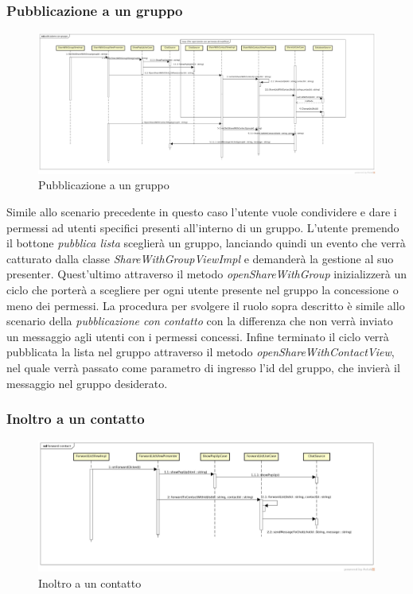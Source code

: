 \subsubsection{Pubblicazione a un gruppo}

\label{Pubblicazione a un gruppo}
\begin{figure}[H]
	\centering
	\includegraphics[width=\textwidth]{Sezioni/Diagrammi/App/publicazione_con_gruppo.jpg}
	\caption{Pubblicazione a un gruppo}
	
\end{figure}

Simile allo scenario precedente in questo caso l'utente vuole condividere e dare i permessi ad utenti specifici presenti all'interno di un gruppo. L'utente premendo il bottone \textit{pubblica lista} sceglierà un gruppo, lanciando quindi un evento che verrà catturato dalla classe \textit{ShareWithGroupViewImpl} e demanderà la gestione al suo presenter. Quest'ultimo attraverso il metodo \textit{openShareWithGroup} inizializzerà un ciclo che porterà a scegliere per ogni utente presente nel gruppo la concessione o meno dei permessi. La procedura per svolgere il ruolo sopra descritto è simile allo scenario della \textit{pubblicazione con contatto} con la differenza che non verrà inviato un messaggio agli utenti con i permessi concessi. Infine terminato il ciclo verrà pubblicata la lista nel gruppo attraverso il metodo \textit{openShareWithContactView}, nel quale verrà passato come parametro di ingresso l'id del gruppo, che invierà il messaggio nel gruppo desiderato.

\subsubsection{Inoltro a un contatto}

\label{Inoltro a un contatto}
\begin{figure}[H]
	\centering
	\includegraphics[width=\textwidth]{Sezioni/Diagrammi/App/forward_contatto.jpg}
	\caption{Inoltro a un contatto}
	
\end{figure}

